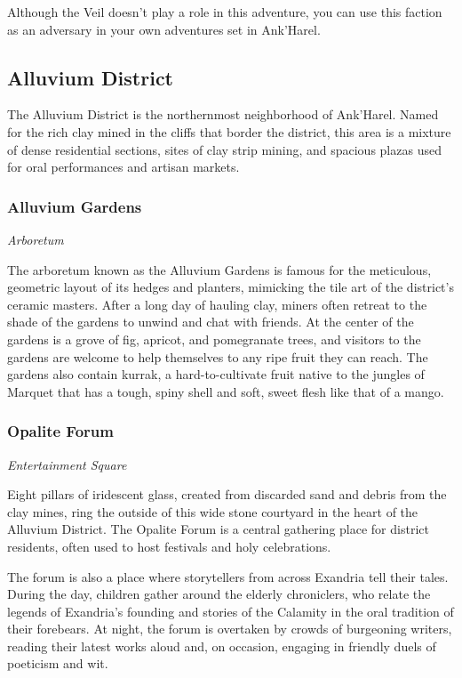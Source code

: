 \documentclass[10pt,a4paper,twoside,bg=print,twocolumn,openany,nodeprecatedcode]{dndbook}
\begin{document}
Although the Veil doesn't play a role in this adventure, you can use this faction as an adversary in your own adventures set in Ank'Harel.

\subsection{Alluvium District}
The Alluvium District is the northernmost neighborhood of Ank'Harel. Named for the rich clay mined in the cliffs that border the district, this area is a mixture of dense residential sections, sites of clay strip mining, and spacious plazas used for oral performances and artisan markets.

\subsubsection{Alluvium Gardens}
\textit{Arboretum}

The arboretum known as the Alluvium Gardens is famous for the meticulous, geometric layout of its hedges and planters, mimicking the tile art of the district's ceramic masters. After a long day of hauling clay, miners often retreat to the shade of the gardens to unwind and chat with friends. At the center of the gardens is a grove of fig, apricot, and pomegranate trees, and visitors to the gardens are welcome to help themselves to any ripe fruit they can reach. The gardens also contain kurrak, a hard-to-cultivate fruit native to the jungles of Marquet that has a tough, spiny shell and soft, sweet flesh like that of a mango.

\subsubsection{Opalite Forum}
\textit{Entertainment Square}

Eight pillars of iridescent glass, created from discarded sand and debris from the clay mines, ring the outside of this wide stone courtyard in the heart of the Alluvium District. The Opalite Forum is a central gathering place for district residents, often used to host festivals and holy celebrations.

The forum is also a place where storytellers from across Exandria tell their tales. During the day, children gather around the elderly chroniclers, who relate the legends of Exandria's founding and stories of the Calamity in the oral tradition of their forebears. At night, the forum is overtaken by crowds of burgeoning writers, reading their latest works aloud and, on occasion, engaging in friendly duels of poeticism and wit.
\end{document}
